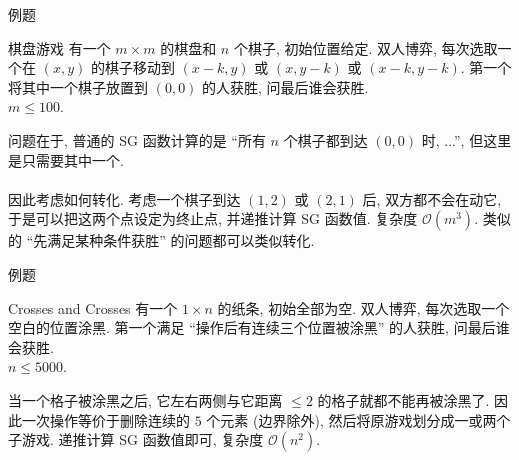 \documentclass{beamer}
\newcommand{\nl}{\\\hspace*{\fill}\\}
\begin{document}
	\begin{frame}{例题}
		\begin{block}{棋盘游戏}
			有一个 $m\times m$ 的棋盘和 $n$ 个棋子, 初始位置给定. 双人博弈, 每次选取一个在 $(x,y)$ 的棋子移动到 $(x-k,y)$ 或 $(x,y-k)$ 或 $(x-k,y-k)$. 第一个将其中一个棋子放置到 $(0,0)$ 的人获胜, 问最后谁会获胜.\\
			$m\leq 100$.
		\end{block}
		\pause
		问题在于, 普通的 SG 函数计算的是 ``所有 $n$ 个棋子都到达 $(0,0)$ 时, ...'', 但这里是只需要其中一个.\nl
		因此考虑如何转化. 考虑一个棋子到达 $(1,2)$ 或 $(2,1)$ 后, 双方都不会在动它, 于是可以把这两个点设定为终止点, 并递推计算 SG 函数值. 复杂度 $\mathcal O(m^3)$. 类似的 ``先满足某种条件获胜'' 的问题都可以类似转化.
	\end{frame}

	\begin{frame}{例题}
		\begin{block}{Crosses and Crosses}
			有一个 $1\times n$ 的纸条, 初始全部为空. 双人博弈, 每次选取一个空白的位置涂黑. 第一个满足 ``操作后有连续三个位置被涂黑'' 的人获胜, 问最后谁会获胜.\\
			$n\leq 5000$.
		\end{block}
		\pause
		当一个格子被涂黑之后, 它左右两侧与它距离 $\leq 2$ 的格子就都不能再被涂黑了. 因此一次操作等价于删除连续的 $5$ 个元素 (边界除外), 然后将原游戏划分成一或两个子游戏. 递推计算 SG 函数值即可, 复杂度 $\mathcal O(n^2)$.
	\end{frame}
\end{document}

